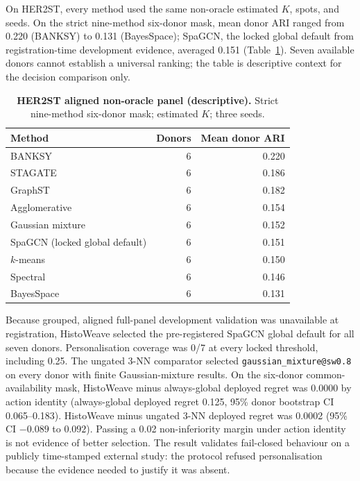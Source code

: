 \documentclass[12pt]{article}
\newcommand{\software}{HistoWeave}
\begin{document}
On HER2ST, every method used the same non-oracle estimated \(K\), spots, and
seeds. On the strict nine-method six-donor mask, mean donor ARI ranged from
0.220 (BANKSY) to 0.131 (BayesSpace); SpaGCN, the locked global default from
registration-time development evidence, averaged 0.151
(Table~\ref{tab:her2st}). Seven available donors cannot establish a universal
ranking; the table is descriptive context for the decision comparison only.

\begin{table}[t]
\centering
\caption{\textbf{HER2ST aligned non-oracle panel (descriptive).} Strict
nine-method six-donor mask; estimated \(K\); three seeds.}
\label{tab:her2st}
\begin{tabular}{@{}lrr@{}}
\toprule
Method & Donors & Mean donor ARI \\
\midrule
BANKSY & 6 & 0.220 \\
STAGATE & 6 & 0.186 \\
GraphST & 6 & 0.182 \\
Agglomerative & 6 & 0.154 \\
Gaussian mixture & 6 & 0.152 \\
SpaGCN (locked global default) & 6 & 0.151 \\
\(k\)-means & 6 & 0.150 \\
Spectral & 6 & 0.146 \\
BayesSpace & 6 & 0.131 \\
\bottomrule
\end{tabular}
\end{table}

Because grouped, aligned full-panel development validation was unavailable at
registration, \software{} selected the pre-registered SpaGCN global default for
all seven donors. Personalisation coverage was 0/7 at every locked threshold,
including 0.25. The ungated 3-NN comparator selected
\texttt{gaussian\_mixture@sw0.8} on every donor with finite Gaussian-mixture
results. On the six-donor common-availability mask, \software{} minus
always-global deployed regret was 0.0000 by action identity (always-global
deployed regret 0.125, 95\% donor bootstrap CI 0.065--0.183). \software{} minus
ungated 3-NN deployed regret was 0.0002 (95\% CI \(-0.089\) to \(0.092\)).
Passing a 0.02 non-inferiority margin under action identity is not evidence of
better selection. The result validates fail-closed behaviour on a publicly
time-stamped external study: the protocol refused personalisation because the
evidence needed to justify it was absent.
\end{document}
